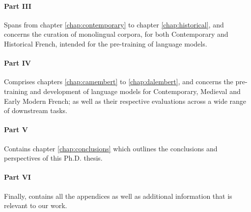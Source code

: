 \paragraph{Part III} Spans from chapter \ref{chap:contemporary} to chapter \ref{chap:historical}, and concerns the curation of monolingual corpora, for both Contemporary and Historical French, intended for the pre-training of language models.

\paragraph{Part IV} Comprises chapters \ref{chap:camembert} to \ref{chap:dalembert}, and concerns the pre-training and development of language models for Contemporary, Medieval and Early Modern French; as well as their respective evaluations across a wide range of downstream tasks.

\paragraph{Part V} Contains chapter \ref{chap:conclusions} which outlines the conclusions and perspectives of this Ph.D. thesis.

\paragraph{Part VI} Finally, contains all the appendices as well as additional information that is relevant to our work.
